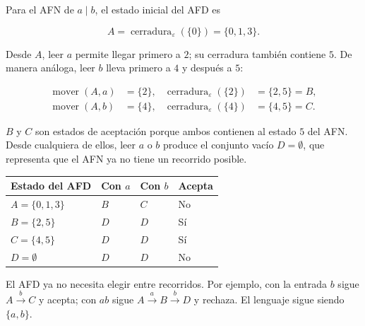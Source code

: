 \documentclass[11pt,spanish]{article}
\providecommand{\tabularnewline}{\\}
\begin{document}
Para el AFN de \(a\mid b\), el estado inicial del AFD es

\[
A=\operatorname{cerradura}_{\varepsilon}(\{0\})=\{0,1,3\}.
\]

Desde \(A\), leer \(a\) permite llegar primero a \(2\); su cerradura también contiene \(5\). De manera análoga, leer \(b\) lleva primero a \(4\) y después a \(5\):

\[
\begin{aligned}
\operatorname{mover}(A,a)&=\{2\}, &
\operatorname{cerradura}_{\varepsilon}(\{2\})&=\{2,5\}=B,\\
\operatorname{mover}(A,b)&=\{4\}, &
\operatorname{cerradura}_{\varepsilon}(\{4\})&=\{4,5\}=C.
\end{aligned}
\]

\(B\) y \(C\) son estados de aceptación porque ambos contienen al estado \(5\) del AFN. Desde cualquiera de ellos, leer \(a\) o \(b\) produce el conjunto vacío \(D=\emptyset\), que representa que el AFN ya no tiene un recorrido posible.

\begin{center}
\renewcommand{\arraystretch}{1.25}
\begin{tabular}{|p{}|p{}|p{}|p{}|}
\hline
\textbf{Estado del AFD} & \textbf{Con \(a\)} & \textbf{Con \(b\)} & \textbf{Acepta} \tabularnewline
\hline
\(A=\{0,1,3\}\) & \(B\) & \(C\) & No \tabularnewline
\hline
\(B=\{2,5\}\) & \(D\) & \(D\) & Sí \tabularnewline
\hline
\(C=\{4,5\}\) & \(D\) & \(D\) & Sí \tabularnewline
\hline
\(D=\emptyset\) & \(D\) & \(D\) & No \tabularnewline
\hline
\end{tabular}
\end{center}

\begin{center}
\end{center}

El AFD ya no necesita elegir entre recorridos. Por ejemplo, con la entrada \(b\) sigue \(A\xrightarrow{b}C\) y acepta; con \(ab\) sigue \(A\xrightarrow{a}B\xrightarrow{b}D\) y rechaza. El lenguaje sigue siendo \(\{a,b\}\).
\end{document}
